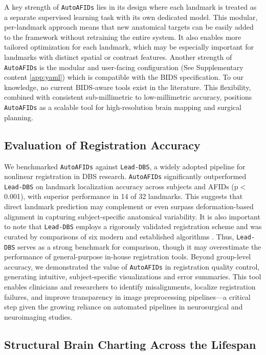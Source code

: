 A key strength of \texttt{AutoAFIDs} lies in its design where each landmark is treated as a separate supervised learning task with its own dedicated model. This modular, per-landmark approach means that new anatomical targets can be easily added to the framework without retraining the entire system. It also enables more tailored optimization for each landmark, which may be especially important for landmarks with distinct spatial or contrast features. Another strength of \texttt{AutoAFIDs} is the modular and user-facing configuration (See Supplementary content \ref{app:yaml}) which is compatible with the BIDS specification. To our knowledge, no current BIDS-aware tools exist in the literature. This flexibility, combined with consistent sub-millimetric to low-millimetric accuracy, positions \texttt{AutoAFIDs} as a scalable tool for high-resolution brain mapping and surgical planning.

\subsection{Evaluation of Registration Accuracy}

We benchmarked \texttt{AutoAFIDs} against \texttt{Lead-DBS}, a widely adopted pipeline for nonlinear registration in DBS research. \texttt{AutoAFIDs} significantly outperformed \texttt{Lead-DBS} on landmark localization accuracy across subjects and AFIDs (p\(<\)0.001), with superior performance in 14 of 32 landmarks. This suggests that direct landmark prediction may complement or even surpass deformation-based alignment in capturing subject-specific anatomical variability. It is also important to note that \texttt{Lead-DBS} employs a rigorously validated registration scheme and was curated by comparisons of six modern and established algorithms \cite{Ewert2019-cc}. Thus, \texttt{Lead-DBS} serves as a strong benchmark for comparison, though it may overestimate the performance of general-purpose in-house registration tools. Beyond group-level accuracy, we demonstrated the value of \texttt{AutoAFIDs} in registration quality control, generating intuitive, subject-specific visualizations and error summaries. This tool enables clinicians and researchers to identify misalignments, localize registration failures, and improve transparency in image preprocessing pipelines—a critical step given the growing reliance on automated pipelines in neurosurgical and neuroimaging studies.

\subsection{Structural Brain Charting Across the Lifespan}

